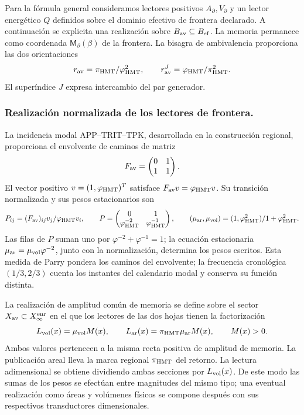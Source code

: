 Para la fórmula general consideramos lectores positivos
\(A_\partial,V_\partial\) y un lector energético \(Q\)
definidos sobre el dominio efectivo de frontera declarado.
A continuación se explicita una realización sobre
\(B_{\rm av}\subseteq B_{\rm ef}\). La memoria permanece como coordenada
\(\mathsf M_\partial(\beta)\) de la frontera. La bisagra de
ambivalencia proporciona las dos orientaciones
\[
 r_{\rm av}=\frac{\pi_{\rm HMT}}{\varphi_{\rm HMT}^2},\qquad
 r_{\rm av}^{J}=\frac{\varphi_{\rm HMT}}{\pi_{\rm HMT}^2}.
\]
El superíndice \(J\) expresa intercambio del par generador.
\subsubsection{Realización normalizada de los lectores de frontera.}
La incidencia modal APP--TRIT--TPK, desarrollada en la construcción
regional, proporciona el envolvente de caminos de matriz
\[
 F_{\rm av}=\begin{pmatrix}0&1\\1&1\end{pmatrix}.
\]
El vector positivo \(v=(1,\varphi_{\rm HMT})^{\mathsf T}\)
satisface \(F_{\rm av}v=\varphi_{\rm HMT}v\). Su transición
normalizada y sus pesos estacionarios son
\begin{equation}
 P_{ij}=\frac{(F_{\rm av})_{ij}v_j}{\varphi_{\rm HMT}v_i},
 \qquad
 P=\begin{pmatrix}0&1\\
 \varphi_{\rm HMT}^{-2}&\varphi_{\rm HMT}^{-1}\end{pmatrix},
 \qquad
 (\mu_{\rm ar},\mu_{\rm vol})
 =\frac{(1,\varphi_{\rm HMT}^{2})}{1+\varphi_{\rm HMT}^{2}}.
 \label{x_reciprocidad:vii:eq:lectores-parry}
\end{equation}
Las filas de \(P\) suman uno por
\(\varphi^{-2}+\varphi^{-1}=1\); la ecuación estacionaria
\(\mu_{\rm ar}=\mu_{\rm vol}\varphi^{-2}\), junto con la
normalización, determina los pesos escritos. Esta medida de Parry
pondera los caminos del envolvente; la frecuencia cronológica
\((1/3,2/3)\) cuenta los instantes del calendario modal y conserva
su función distinta.

La realización de amplitud común de memoria se define sobre el sector
\(\mathcal X_{\rm av}\subset\mathcal X_\infty^{\rm enr}\) en el que
los lectores de las dos hojas tienen la factorización
\begin{equation}
 \mathcal L_{\rm vol}(x)=\mu_{\rm vol}\mathcal M(x),\qquad
 \mathcal L_{\rm ar}(x)=\pi_{\rm HMT}\mu_{\rm ar}\mathcal M(x),
 \qquad \mathcal M(x)>0.
 \label{x_reciprocidad:vii:eq:lectores-amplitud-comun}
\end{equation}
Ambos valores pertenecen a la misma recta positiva de amplitud de
memoria. La publicación areal lleva la marca regional
\(\pi_{\rm HMT}\) del retorno. La lectura adimensional se obtiene
dividiendo ambas secciones por \(\mathcal L_{\rm vol}(x)\).
De este modo las sumas de los pesos se efectúan entre magnitudes del
mismo tipo; una eventual realización como áreas y volúmenes físicos
se compone después con sus respectivos transductores dimensionales.

